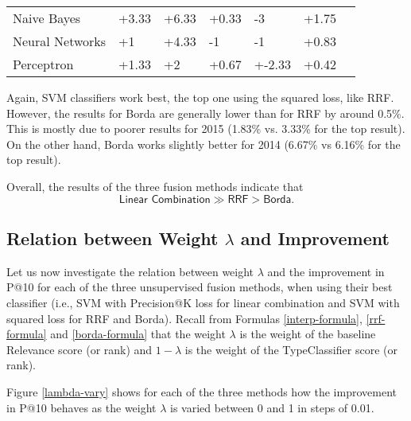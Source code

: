 \begin{table}[h!]
{\begin{tabular}{@{}lllllll@{}}
Naive Bayes                                              & +3.33           & +6.33              & +0.33           & -3                & +1.75          \\
Neural Networks                                         & +1              & +4.33              & -1             & -1                & +0.83          \\
Perceptron                                              & +1.33           & +2                 & +0.67           & +-2.33             & +0.42         \\\bottomrule
\end{tabular}%
}
\end{table}

Again, SVM classifiers work best, the top one using the squared loss, like RRF.
However, the results for Borda are generally lower than for RRF by around 0.5\%. This is mostly due
to poorer results for 2015 (1.83\% vs. 3.33\% for the top result).
On the other hand, Borda works slightly better for 2014 (6.67\% vs 6.16\% for the top result).

Overall, the results of the three fusion methods indicate that \[\textsf{Linear Combination} \gg \textsf{RRF} > \textsf{Borda}.\]

\subsection{Relation between Weight $\lambda$ and Improvement}
Let us now investigate the relation between weight $\lambda$ and the improvement in P@10 for each of the three unsupervised
fusion methods, when using their best classifier (i.e., SVM with Precision@K loss for linear combination
and SVM with squared loss for RRF and Borda).
Recall from Formulas \ref{interp-formula}, \ref{rrf-formula} and \ref{borda-formula} that the weight $\lambda$ is the
weight of the baseline \textsf{Relevance} score (or rank) and $1-\lambda$ is the weight of the \textsf{TypeClassifier} score (or rank).

Figure \ref{lambda-vary} shows for each of the three methods
how the improvement in P@10 behaves as the weight $\lambda$ is varied between 0 and 1 in steps of 0.01.

